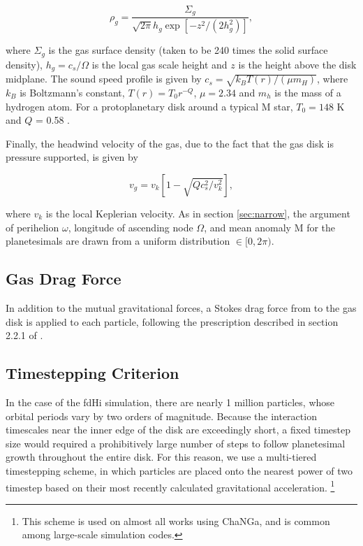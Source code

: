 \documentclass[twocolumn]{aastex63}
\begin{document}
\begin{equation}\label{eq:rho_gas}
	\rho_{g} = \frac{\Sigma_{g}}{\sqrt{2 \pi} h_{g} \exp\left[ -z^{2} / \left( 2 h_{g}^{2} \right) \right]},
\end{equation}

\noindent where $\Sigma_{g}$ is the gas surface density (taken to be
240 times the solid surface density), $h_{g} = c_{s} / \Omega$ is the local gas scale height and $z$ is the height above the disk midplane. The sound speed profile is given by $c_{s} = \sqrt{k_{B} T(r) / \left( \mu m_{H} \right)}$, where $k_{B}$ is Boltzmann's constant, $T(r) = T_{0} r^{-Q}$, $\mu = 2.34$ and $m_{h}$ is the mass of a hydrogen atom. For a protoplanetary disk around a typical M star, $T_{0} = 148$ K and $Q$ = 0.58 \citep{andrews05}.

Finally, the headwind velocity of the gas, due to the fact that the gas disk is pressure supported, is given by

\begin{equation}\label{eq:v_gas}
	v_{g} = v_{k} \left[ 1 - \sqrt{ Q c_{s}^2 / v_{k}^2} \right],
\end{equation}

\noindent where $v_{k}$ is the local Keplerian velocity. As in section
\ref{sec:narrow}, the argument of perihelion $\omega$, longitude of
ascending node $\Omega$, and mean anomaly M for the planetesimals are drawn from a uniform distribution $\in [0, 2 \pi)$.

\subsection{Gas Drag Force}

In addition to the mutual gravitational forces, a Stokes drag force from to the gas disk is applied to each particle, following the prescription described in section 2.2.1 of \citet{morishima10}.

\subsection{Timestepping Criterion}

In the case of the fdHi simulation, there are nearly 1 million
particles, whose orbital periods vary by two orders of magnitude. Because the
interaction timescales near the inner edge of the
disk are exceedingly short, a fixed timestep size would required a prohibitively large
number of steps to follow planetesimal growth throughout the entire
disk. For this reason, we use a multi-tiered timestepping scheme, in
which particles are placed onto the nearest power of two timestep
based on their most recently calculated gravitational
acceleration. \footnote{This scheme is used on almost all works using ChaNGa,
and is common among large-scale simulation codes.}
\end{document}
